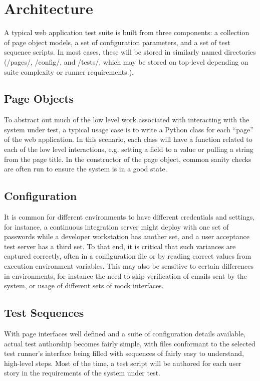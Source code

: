 \section{Architecture}
A typical web application test suite is built from three components: a collection of page object models, a set of configuration parameters, and a set of test sequence scripts. In most cases, these will be stored in similarly named directories (/pages/, /config/, and /tests/, which may be stored on top-level depending on suite complexity or runner requirements.).\citep{leotta2013improving}

\subsection{Page Objects}
To abstract out much of the low level work associated with interacting with the system under test, a typical usage case is to write a Python class for each ``page'' of the web application.\citep{kung2000object} In this scenario, each class will have a function related to each of the low level interactions, e.g. setting a field to a value or pulling a string from the page title. In the constructor of the page object, common sanity checks are often run to ensure the system is in a good state.

\subsection{Configuration}
It is common for different environments to have different credentials and settings, for instance, a continuous integration server might deploy with one set of passwords while a developer workstation has another set, and a user acceptance test server has a third set. To that end, it is critical that such variances are captured correctly, often in a configuration file or by reading correct values from execution environment variables.\citep{marchetto2008state} This may also be sensitive to certain differences in environments, for instance the need to skip verification of emails sent by the system, or usage of different sets of mock interfaces.

\subsection{Test Sequences}
With page interfaces well defined and a suite of configuration details available, actual test authorship becomes fairly simple, with files conformant to the selected test runner's interface being filled with sequences of fairly easy to understand, high-level steps. Most of the time, a test script will be authored for each user story in the requirements of the system under test.

